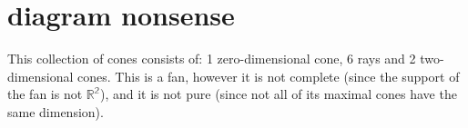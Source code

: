 \documentclass[12pt,a4paper]{report}
\begin{document}





\chapter{diagram nonsense}

\begin{figure}
\end{figure}

This collection of cones consists of: 1 zero-dimensional cone, 6 rays and 2 two-dimensional cones. This is a fan, however it is not complete (since the support of the fan is not $\mathbb{R^{2}}$), and it is not pure (since not all of its maximal cones have the same dimension).
\end{document}
